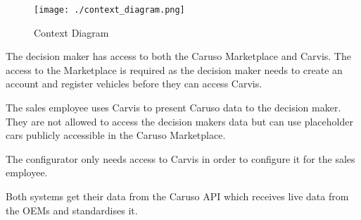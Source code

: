 \begin{figure}[ht]
  \centering
  \texttt{[image: ./context\_diagram.png]}
  \caption{Context Diagram}
  \label{ScopeOfWork:ContextDiagram}
\end{figure}

The decision maker has access to both the Caruso Marketplace and Carvis. The access to the Marketplace is required as the decision maker needs to create an account and register vehicles before they can access Carvis.

The sales employee uses Carvis to present Caruso data to the decision maker. They are not allowed to access the decision makers data but can use placeholder cars publicly accessible in the Caruso Marketplace.

The configurator only needs access to Carvis in order to configure it for the sales employee.

Both systems get their data from the Caruso API which receives live data from the OEMs and standardises it.
